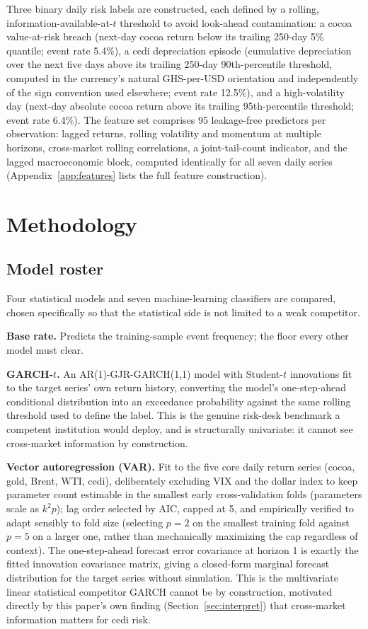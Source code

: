 \documentclass[final,3p,times,authoryear]{elsarticle}
\begin{document}
Three binary daily risk labels are constructed, each defined by a
rolling, information-available-at-$t$ threshold to avoid look-ahead
contamination: a cocoa value-at-risk breach (next-day cocoa return below
its trailing 250-day 5\% quantile; event rate 5.4\%), a cedi depreciation
episode (cumulative depreciation over the next five days above its
trailing 250-day 90th-percentile threshold, computed in the currency's
natural GHS-per-USD orientation and independently of the sign convention
used elsewhere; event rate 12.5\%), and a high-volatility day (next-day
absolute cocoa return above its trailing 95th-percentile threshold;
event rate 6.4\%). The feature set comprises 95 leakage-free predictors
per observation: lagged returns, rolling volatility and momentum at
multiple horizons, cross-market rolling correlations, a joint-tail-count
indicator, and the lagged macroeconomic block, computed identically for
all seven daily series (Appendix~\ref{app:features} lists the full
feature construction).

\section{Methodology}
\label{sec:methodology}

\subsection{Model roster}
\label{sec:models}

Four statistical models and seven machine-learning classifiers are
compared, chosen specifically so that the statistical side is not
limited to a weak competitor.

\textbf{Base rate.} Predicts the training-sample event frequency; the
floor every other model must clear.

\textbf{GARCH-$t$.} An AR(1)-GJR-GARCH(1,1) model with Student-$t$
innovations fit to the target series' own return history, converting the
model's one-step-ahead conditional distribution into an exceedance
probability against the same rolling threshold used to define the
label. This is the genuine risk-desk benchmark a competent institution
would deploy, and is structurally univariate: it cannot see cross-market
information by construction.

\textbf{Vector autoregression (VAR).} Fit to the five core daily return
series (cocoa, gold, Brent, WTI, cedi), deliberately excluding VIX and
the dollar index to keep parameter count estimable in the smallest
early cross-validation folds (parameters scale as $k^2 p$); lag order
selected by AIC, capped at 5, and empirically verified to adapt
sensibly to fold size (selecting $p=2$ on the smallest training fold
against $p=5$ on a larger one, rather than mechanically maximizing the
cap regardless of context). The one-step-ahead forecast error covariance
at horizon 1 is exactly the fitted innovation covariance matrix, giving
a closed-form marginal forecast distribution for the target series
without simulation. This is the multivariate linear statistical
competitor GARCH cannot be by construction, motivated directly by this
paper's own finding (Section~\ref{sec:interpret}) that cross-market
information matters for cedi risk.
\end{document}
